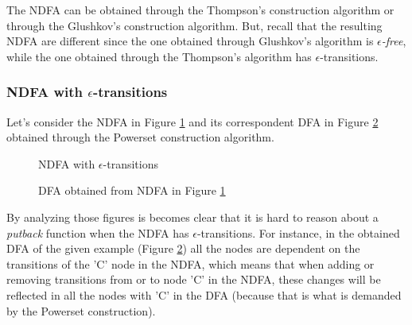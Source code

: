 The NDFA can be obtained through the Thompson's construction algorithm or through the Glushkov's construction algorithm. But, recall that the resulting NDFA are different since the one obtained through Glushkov's algorithm is \textit{$\epsilon$-free}, while the one obtained through the Thompson's algorithm has $\epsilon$-transitions. 

\subsubsection{NDFA with $\epsilon$-transitions}
Let's consider the NDFA in Figure \ref{fig:epsilon} and its correspondent DFA in Figure \ref{fig:epsilondfa} obtained through the Powerset construction algorithm. 

\begin{figure}
    \centering
    \caption{NDFA with $\epsilon$-transitions}
    \label{fig:epsilon}
\end{figure}

\begin{figure}
    \centering
    \caption{DFA obtained from NDFA in Figure \ref{fig:epsilon}}
    \label{fig:epsilondfa}
\end{figure}

By analyzing  those figures is becomes clear that it is hard to reason about a \textit{putback} function when the NDFA has $\epsilon$-transitions. For instance, in the obtained DFA of the given example (Figure \ref{fig:epsilondfa}) all the nodes are dependent on the transitions of the 'C' node in the NDFA, which means that when adding or removing transitions from or to node 'C' in the NDFA, these changes will be reflected in all the nodes with 'C' in the DFA (because that is what is demanded by the Powerset construction).

